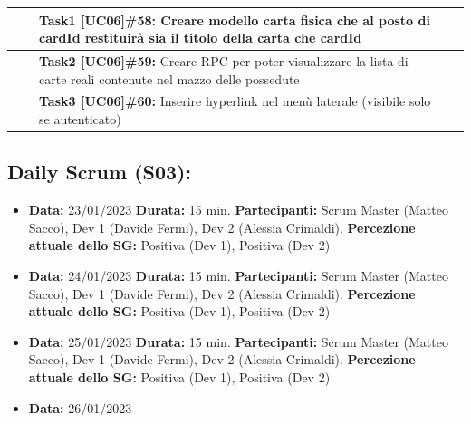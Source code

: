 \documentclass[a4paper, oneside]{article}
\newcommand\tre{Scrum Master (Matteo Sacco), Dev 1 (Davide Fermi), Dev 2 (Alessia Crimaldi).}
\begin{document}
\begin{landscape}
\begin{tabular}{ | p{6cm} | p{5cm} | p{6.2cm} | p{3.8cm} | p{2cm}| }
            & & \textbf{Task1 [UC06]\#58:} Creare modello carta fisica che al posto di cardId restituirà sia il titolo della carta che cardId & & \\
            \hline
            & & \textbf{Task2 [UC06]\#59:} Creare RPC per poter visualizzare la lista di carte reali contenute nel mazzo delle possedute & & \\
            \hline
            & & \textbf{Task3 [UC06]\#60:} Inserire hyperlink nel menù laterale (visibile solo se autenticato) & & \\
            \hline
        \end{tabular}

        \newpage
        \normalsize
        \subsection{Daily Scrum (S03):}
        \begin{itemize}
            \item \textbf{Data:} 23/01/2023
            \newline \textbf{Durata:} 15 min.
            \newline \textbf{Partecipanti:} \tre
            \newline \textbf{Percezione attuale dello SG:} Positiva (Dev 1), Positiva (Dev 2)
        \end{itemize}
        \begin{itemize}
            \item \textbf{Data:} 24/01/2023
            \newline \textbf{Durata:} 15 min.
            \newline \textbf{Partecipanti:} \tre
            \newline \textbf{Percezione attuale dello SG:} Positiva (Dev 1), Positiva (Dev 2)
        \end{itemize}
        \begin{itemize}
            \item \textbf{Data:} 25/01/2023
            \newline \textbf{Durata:} 15 min.
            \newline \textbf{Partecipanti:} \tre
            \newline \textbf{Percezione attuale dello SG:} Positiva (Dev 1), Positiva (Dev 2)
        \end{itemize}
        \begin{itemize}
            \item \textbf{Data:} 26/01/2023

\end{itemize}
\end{landscape}
\end{document}
